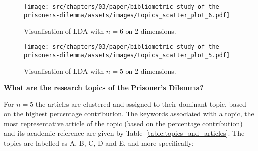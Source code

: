 \begin{figure}[!hbtp]
    \centering
    \begin{minipage}{.45\textwidth}
        \centering
        \texttt{[image: src/chapters/03/paper/bibliometric-study-of-the-prisoners-dilemma/assets/images/topics\_scatter\_plot\_6.pdf]}
        \caption{Visualisation of LDA with \(n=6\) on 2 dimensions.}\label{fig:lda_visualisation_six}
    \end{minipage}\hfill
    \begin{minipage}{.45\textwidth}
        \centering
        \texttt{[image: src/chapters/03/paper/bibliometric-study-of-the-prisoners-dilemma/assets/images/topics\_scatter\_plot\_5.pdf]}
        \caption{Visualisation of LDA with \(n=5\) on 2 dimensions.}\label{fig:lda_visualisation_five}
    \end{minipage}
\end{figure}

\textbf{What are the research topics of the Prisoner's Dilemma?}

For \(n=5\) the articles are clustered and assigned to their dominant topic,
based on the highest percentage contribution. The keywords associated with a
topic, the most representative article of the topic (based on the
percentage contribution) and its academic reference are given by
Table~\ref{table:topics_and_articles}. The topics are labelled as A, B, C, D and
E, and more specifically:

